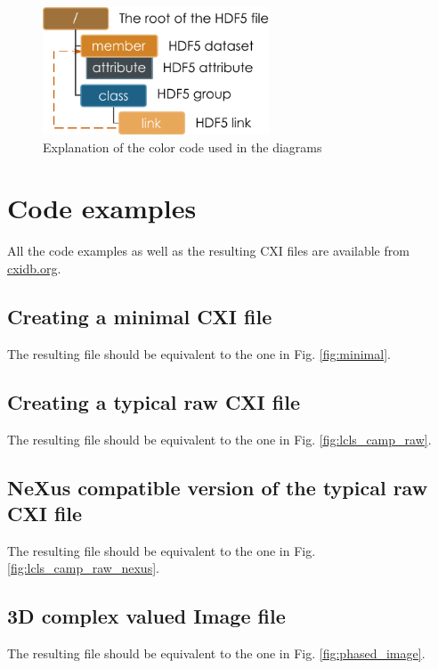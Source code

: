 \documentclass[usletter,11pt]{article}
\begin{document}
\begin{figure}[h!]
\centering
\includegraphics[width=0.6\textwidth]{diagram_labels.pdf}
\caption{Explanation of the color code used in the diagrams}
\label{fig:color_code}
\end{figure}

\clearpage
\section{Code examples}

All the code examples as well as the resulting CXI files are available from \url{cxidb.org}.
 
\subsection{Creating a minimal CXI file}

The resulting file should be equivalent to the one in
Fig. \ref{fig:minimal}.

\clearpage
\subsection{Creating a typical raw CXI file}

The resulting file should be equivalent to the one in
Fig. \ref{fig:lcls_camp_raw}.

\clearpage
\subsection{NeXus compatible version of the typical raw CXI file}

The resulting file should be equivalent to the one in
Fig. \ref{fig:lcls_camp_raw_nexus}.

\clearpage
\subsection{3D complex valued Image file}

The resulting file should be equivalent to the one in Fig. \ref{fig:phased_image}.
\end{document}
